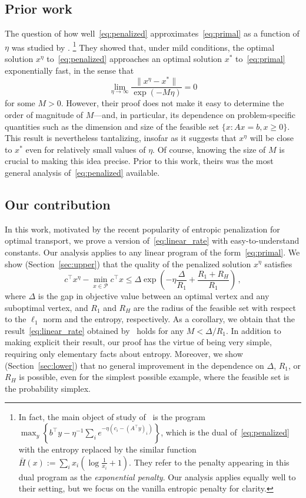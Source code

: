 \documentclass[final,12pt]{colt2018}
\newcommand{\cP}{\mathcal{P}}
\newcommand{\1}{\mathds{1}}
\begin{document}
\subsection{Prior work}
The question of how well~\eqref{eq:penalized} approximates~\eqref{eq:primal} as a function of $\eta$ was studied by \citet{ComSan94}.%
\footnote{In fact, the main object of study of~\citet{ComSan94} is the program $\max_y \left\{b^\top y - \eta^{-1} \sum_i e^{- \eta (c_i - (A^\top y)_i)}\right\}$,
which is the dual of~\eqref{eq:penalized} with the entropy replaced by the similar function $\bar{H}(x) := \sum_{i} x_i \left(\log \frac{1}{x_i} + 1\right)$.
They refer to the penalty appearing in this dual program as the \emph{exponential penalty}.
Our analysis applies equally well to their setting, but we focus on the vanilla entropic penalty for clarity.}
They showed that, under mild conditions, the optimal solution $x^\eta$ to~\eqref{eq:penalized} approaches an optimal solution $x^*$ to~\eqref{eq:primal} exponentially fast, in the sense that
\begin{equation}\label{eq:linear_rate}
\lim_{\eta \to \infty} \frac{\|x^\eta - x^*\|}{\exp(- M \eta)} = 0
\end{equation}
for some $M > 0$.
However, their proof does not make it easy to determine the order of magnitude of $M$---and, in particular, its dependence on problem-specific quantities such as the dimension and size of the feasible set $\{x : Ax = b, x \geq 0\}$.
This result is nevertheless tantalizing, insofar as it suggests that $x^\eta$ will be close to $x^*$ even for relatively small values of $\eta$.
Of course, knowing the size of $M$ is crucial to making this idea precise.
Prior to this work, theirs was the most general analysis of~\eqref{eq:penalized} available.

\subsection{Our contribution}
In this work, motivated by the recent popularity of entropic penalization for optimal transport, we prove a version of~\eqref{eq:linear_rate} with easy-to-understand constants. Our analysis applies to any linear program of the form~\eqref{eq:primal}.
We show (Section~\ref{sec:upper}) that the quality of the penalized solution $x^\eta$ satisfies
\begin{equation*}
c^\top x^\eta - \min_{x \in \cP} c^\top x \leq \Delta \exp\left(- \eta \frac{\Delta}{R_1} + \frac{R_1 + R_H}{R_1}\right)\,,
\end{equation*}
where $\Delta$ is the gap in objective value between an optimal vertex and any suboptimal vertex, and $R_1$ and $R_H$ are the radius of the feasible set with respect to the $\ell_1$ norm and the entropy, respectively.
As a corollary, we obtain that the result~\eqref{eq:linear_rate} obtained by~\citet{ComSan94} holds for any $M < \Delta/R_1$.
In addition to making explicit their result, our proof has the virtue of being very simple, requiring only elementary facts about entropy.
Moreover, we show (Section~\ref{sec:lower}) that no general improvement in the dependence on $\Delta$, $R_1$, or $R_H$ is possible, even for the simplest possible example, where the feasible set is the probability simplex.
\end{document}
